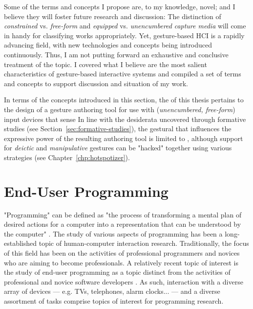 Some of the terms and concepts I propose are, to my knowledge, novel; and I believe they will foster future research and discussion: The distinction of \emph{constrained} vs. \emph{free-form} and \emph{equipped} vs. \emph{unencumbered} \emph{capture media} will come in handy for classifying works appropriately. Yet, gesture-based HCI is a rapidly advancing field, with new technologies and concepts being introduced continuously. Thus, I am not putting forward an exhaustive and conclusive treatment of the topic. I covered what I believe are the most salient characteristics of gesture-based interactive systems and compiled a set of terms and concepts to support discussion and situation of my work.

In terms of the concepts introduced in this section, the  of this thesis pertains to the design of a gesture authoring tool for use with  (\emph{unencumbered, free-form}) input devices that sense  In line with the desiderata uncovered through formative studies (see Section~\ref{sec:formative-studies}), the gestural  that influences the expressive power of the resulting authoring tool is limited to , although support for \emph{deictic} and \emph{manipulative} gestures can be "hacked" together using various strategies (see Chapter~\ref{chp:hotspotizer}).

\section{End-User Programming}
\label{sec:end-user-programming}

"Programming" can be defined as "the process of transforming a mental plan of desired actions for a computer into a representation that can be understood by the computer" \parencite{Myers:2006}. The study of various aspects of programming has been a long-established topic of human-computer interaction research. Traditionally, the focus of this field has been on the activities of professional programmers and novices who are aiming to become professionals. A relatively recent topic of interest is the study of end-user programming as a topic distinct from the activities of professional and novice software developers \parencite{Myers:2006}. As such, interaction with a diverse array of devices --- e.g. TVs, telephones, alarm clocks... --- and a diverse assortment of tasks comprise topics of interest for programming research.

